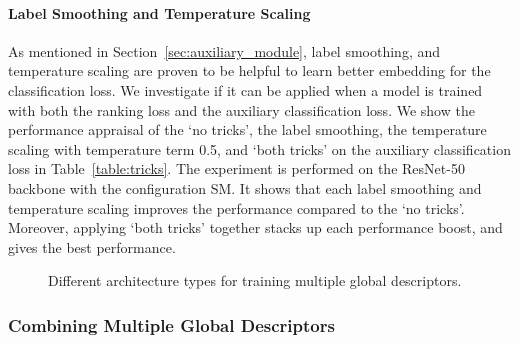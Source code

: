 \documentclass[10pt,twocolumn,letterpaper]{article}
\begin{document}
\begin{CJK}{UTF8}{mj}
\vspace{-4mm}
\paragraph{Label Smoothing and Temperature Scaling} \label{sec:label_smoothing_and_temperature_scaling}
As mentioned in Section~\ref{sec:auxiliary_module}, label smoothing, and temperature scaling are proven to be helpful to learn better embedding for the classification loss.
We investigate if it can be applied when a model is trained with both the ranking loss and the auxiliary classification loss.
We show the performance appraisal of the `no tricks', the label smoothing, the temperature scaling with temperature term 0.5, and `both tricks' on the auxiliary classification loss in Table~\ref{table:tricks}.
The experiment is performed on the ResNet-50~\cite{he2016deep} backbone with the configuration SM.
It shows that each label smoothing and temperature scaling improves the performance compared to the `no tricks'.
Moreover, applying `both tricks' together stacks up each performance boost, and gives the best performance.

\begin{figure}[t!]
\begin{center}
\vspace{0.1em}
\end{center}
   \caption{Different architecture types for training multiple global descriptors.}
\label{fig:architecture_type}
\vspace{-0.3em}
\end{figure}

\subsubsection{Combining Multiple Global Descriptors}


\end{CJK}
\end{document}
